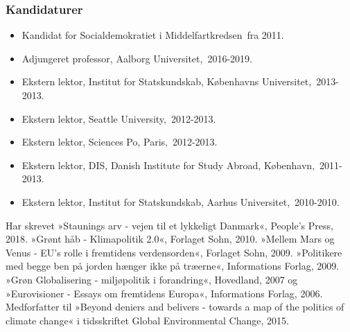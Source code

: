 \documentclass[11pt, a4paper]{awesome-cv}
\begin{document}
\begin{cvletter}
\subsubsection*{Kandidaturer}
\begin{itemize}
\item Kandidat for Socialdemokratiet i Middelfartkredsen fra 2011.
\end{itemize}
\begin{itemize}
\item Adjungeret professor, Aalborg Universitet, 2016-2019.
\item Ekstern lektor, Institut for Statskundskab, Københavns Universitet, 2013-2013.
\item Ekstern lektor, Seattle University, 2012-2013.
\item Ekstern lektor, Sciences Po, Paris, 2012-2013.
\item Ekstern lektor, DIS, Danish Institute for Study Abroad, København, 2011-2013.
\item Ekstern lektor, Institut for Statskundskab, Aarhus Universitet, 2010-2010.
\end{itemize}
Har skrevet »Staunings arv - vejen til et lykkeligt Danmark«, People's Press, 2018. »Grønt håb - Klimapolitik 2.0«, Forlaget Sohn, 2010. »Mellem Mars og Venus - EU's rolle i fremtidens verdensorden«, Forlaget Sohn, 2009. »Politikere med begge ben på jorden hænger ikke på træerne«, Informations Forlag, 2009. »Grøn Globalisering - miljøpolitik i forandring«, Hovedland, 2007 og »Eurovisioner - Essays om fremtidens Europa«, Informations Forlag, 2006. Medforfatter til »Beyond deniers and belivers - towards a map of the politics of climate change« i tidsskriftet Global Environmental Change, 2015. 

\end{cvletter}
\end{document}
